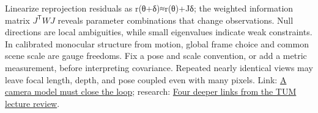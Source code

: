 Linearize reprojection residuals as r(θ+δ)≈r(θ)+Jδ; the weighted information matrix \(J^{\mathsf T}WJ\) reveals parameter combinations that change observations. Null directions are local ambiguities, while small eigenvalues indicate weak constraints. In calibrated monocular structure from motion, global frame choice and common scene scale are gauge freedoms. Fix a pose and scale convention, or add a metric measurement, before interpreting covariance. Repeated nearly identical views may leave focal length, depth, and pose coupled even with many pixels. Link: \href{Continuous\%20Notes/Computing\%20Foundations\%20-\%20From\%20Bits\%20to\%20C++\%20and\%20Systems\%20APIs\#A\%20camera\%20model\%20must\%20close\%20the\%20loop}{A camera model must close the loop}; research: \href{Continuous\%20Notes/Computing\%20Foundations\%20-\%20From\%20Bits\%20to\%20C++\%20and\%20Systems\%20APIs\#Four\%20deeper\%20links\%20from\%20the\%20TUM\%20lecture\%20review}{Four deeper links from the TUM lecture review}.
